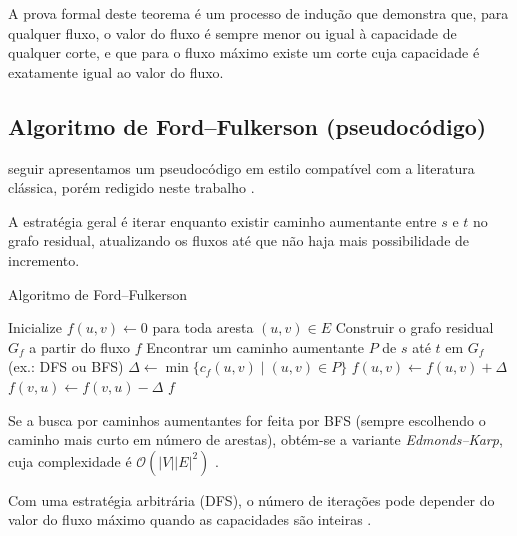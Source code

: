 \documentclass[12pt]{article}
\begin{document}
\noindent A prova formal deste teorema é um processo de indução que demonstra que, para qualquer fluxo, o valor do fluxo é sempre menor ou igual à capacidade de qualquer corte, e que para o fluxo máximo existe um corte cuja capacidade é exatamente igual ao valor do fluxo.



\newpage
\subsection{Algoritmo de Ford–Fulkerson (pseudocódigo)} 

 seguir apresentamos um pseudocódigo em estilo compatível com a literatura clássica, porém redigido neste trabalho \cite{cormen2009,ahuja1993,kleinberg2006}. 

A estratégia geral é iterar enquanto existir caminho aumentante entre $s$ e $t$ no grafo residual, atualizando os fluxos até que não haja mais possibilidade de incremento.



\begin{algorithm}[H]
\caption{Algoritmo de Ford–Fulkerson}
\label{alg:ford_fulkerson}
\begin{algorithmic}[1]
    \State Inicialize $f(u,v) \gets 0$ para toda aresta $(u,v) \in E$
        \State Construir o grafo residual $G_f$ a partir do fluxo $f$
        \State Encontrar um caminho aumentante $P$ de $s$ até $t$ em $G_f$ (ex.: DFS ou BFS)
        \State $\Delta \gets \min\{c_f(u,v) \mid (u,v) \in P\}$ 
            \State $f(u,v) \gets f(u,v) + \Delta$ 
            \State $f(v,u) \gets f(v,u) - \Delta$ 
        \EndFor
    \EndWhile
    \State \Return $f$ 
\EndProcedure
\end{algorithmic}
\end{algorithm}


\noindent Se a busca por caminhos aumentantes for feita por BFS (sempre escolhendo o caminho mais curto em número de arestas), obtém-se a variante \emph{Edmonds–Karp}, cuja complexidade é $\mathcal{O}(|V||E|^2)$ \cite{edmonds1972,ahuja1993}. 

Com uma estratégia arbitrária (DFS), o número de iterações pode depender do valor do fluxo máximo quando as capacidades são inteiras \cite{ford1956,tarjan1983}.
\end{document}
